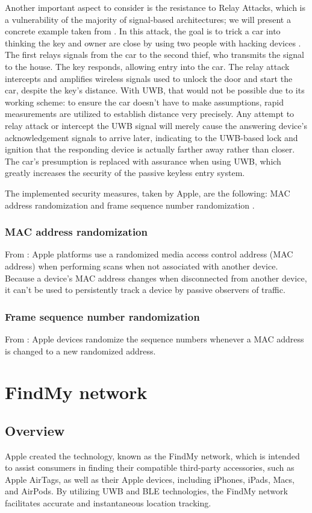 \documentclass[english]{article}
\begin{document}
Another important aspect to consider is the resistance to Relay Attacks, which is a vulnerability of the majority of signal-based architectures; we will present a concrete example taken from \cite{Global_2020}. In this attack, the goal is to trick a car into thinking the key and owner are close by using two people with hacking devices \cite{renesas}. The first relays signals from the car to the second thief, who transmits the signal to the house. The key responds, allowing entry into the car. The relay attack intercepts and amplifies wireless signals used to unlock the door and start the car, despite the key's distance. With UWB, that would not be possible due to its working scheme: to ensure the car doesn't have to make assumptions, rapid measurements are utilized to establish distance very precisely. Any attempt to relay attack or intercept the UWB signal will merely cause the answering device's acknowledgement signals to arrive later, indicating to the UWB-based lock and ignition that the responding device is actually farther away rather than closer. The car's presumption is replaced with assurance when using UWB, which greatly increases the security of the passive keyless entry system.

The implemented security measures, taken by Apple, are the following: MAC address randomization and frame sequence number randomization \cite{aps}.

\subsubsection{MAC address randomization}
From \cite{aps}: Apple platforms use a randomized media access control address (MAC address) when performing scans when not associated with another device. Because a device’s MAC address changes when disconnected from another device, it can’t be used to persistently track a device by passive observers of traffic.

\subsubsection{Frame sequence number randomization}
From \cite{aps}: Apple devices randomize the sequence numbers whenever a MAC address is changed to a new randomized address.

\section{FindMy network}\label{sec:find}
\subsection{Overview}
Apple created the technology, known as the FindMy network, which is intended to assist consumers in finding their compatible third-party accessories, such as Apple AirTags, as well as their Apple devices, including iPhones, iPads, Macs, and AirPods. By utilizing UWB and BLE technologies, the FindMy network facilitates accurate and instantaneous location tracking.
\end{document}
